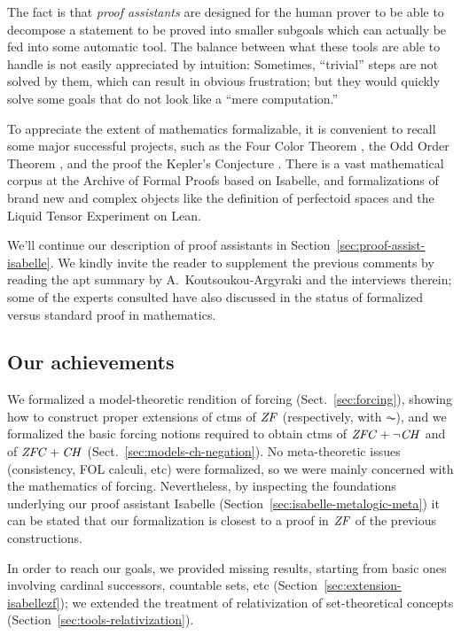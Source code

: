 The fact is that \emph{proof assistants} are designed for the human prover to
be able to decompose a statement to be proved into smaller subgoals
which can actually be fed into some automatic tool. The balance between
what these tools are able to handle is not  easily appreciated by
intuition: Sometimes, ``trivial'' steps are not solved by them, which
can result in obvious frustration; but they would quickly solve some
goals that do not look like a ``mere computation.''

To appreciate the extent of mathematics formalizable, it is convenient to recall
some major successful projects, such as the Four Color Theorem
\cite{MR2463991}, the Odd Order Theorem
\cite{10.1007/978-3-642-39634-2_14}, and the proof the Kepler's
Conjecture \cite{MR3659768}. There is a vast mathematical corpus at
the Archive of Formal Proofs based on Isabelle, and formalizations of
brand new and complex objects like the definition of perfectoid spaces \cite{10.1145/3372885.3373830}
and the Liquid Tensor Experiment \cite{LTE2020,LTE2021} on Lean.

We'll continue our description of proof assistants in
Section~\ref{sec:proof-assist-isabelle}. We kindly invite the reader
to supplement the previous comments by reading the apt summary by
A.~Koutsoukou-Argyraki \cite{angeliki} and the interviews
therein; some of the experts consulted have also discussed
in \cite{2022arXiv220704779B} the status of formalized versus standard
proof in mathematics.

\subsection{Our achievements}
We formalized a model-theoretic rendition of forcing (Sect.~\ref{sec:forcing}), showing how to
construct proper extensions of ctms of $\mathit{ZF}$ (respectively, with
$\AC$), and we formalized the basic forcing notions required to obtain
ctms of $\mathit{ZFC} + \neg\mathit{CH}$ and of $\mathit{ZFC} + \mathit{CH}$ (Sect.~\ref{sec:models-ch-negation}). No meta-theoretic issues
(consistency, FOL calculi, etc) were formalized, so we were mainly
concerned with the mathematics of forcing. Nevertheless, by inspecting
the foundations underlying our proof assistant Isabelle
(Section~\ref{sec:isabelle-metalogic-meta}) it can be stated that our
formalization is closest to a proof in $\mathit{ZF}$ of the previous
constructions.

In order to reach our goals, we provided missing results, starting from basic ones
involving cardinal successors, countable sets, etc
(Section~\ref{sec:extension-isabellezf}); we extended the treatment of relativization of
set-theoretical concepts (Section~\ref{sec:tools-relativization}).

